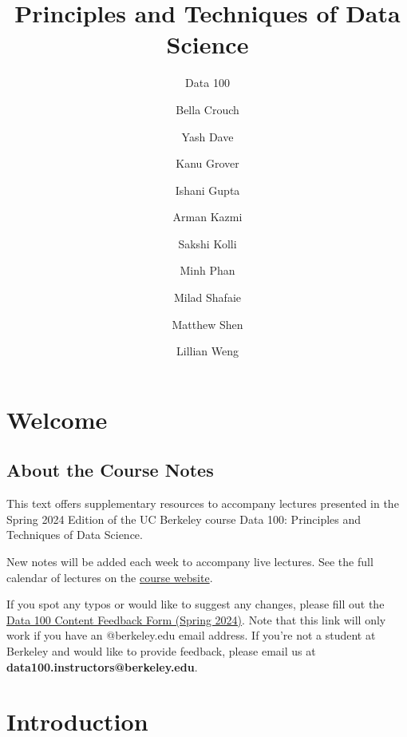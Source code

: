 \documentclass[
  letterpaper,
  DIV=11,
  numbers=noendperiod]{scrreprt}
\title{Principles and Techniques of Data Science}
\subtitle{Data 100}
\author{Bella Crouch \and Yash Dave \and Kanu Grover \and Ishani
Gupta \and Arman Kazmi \and Sakshi Kolli \and Minh Phan \and Milad
Shafaie \and Matthew Shen \and Lillian Weng}
\date{}
\renewcommand*\contentsname{Table of contents}
\newcommand\contentsname{Table of contents}
\begin{document}
\maketitle
\ifdefined\Shaded\renewenvironment{Shaded}{\begin{tcolorbox}[boxrule=0pt, frame hidden, enhanced, sharp corners, breakable, borderline west={3pt}{0pt}{shadecolor}, interior hidden]}{\end{tcolorbox}}\fi

\renewcommand*\contentsname{Table of contents}
{
\hypersetup{linkcolor=}
\setcounter{tocdepth}{2}
\tableofcontents
}

\hypertarget{welcome}{%
\chapter*{Welcome}\label{welcome}}


\hypertarget{about-the-course-notes}{%
\section*{About the Course Notes}\label{about-the-course-notes}}


This text offers supplementary resources to accompany lectures presented
in the Spring 2024 Edition of the UC Berkeley course Data 100:
Principles and Techniques of Data Science.

New notes will be added each week to accompany live lectures. See the
full calendar of lectures on the \href{https://ds100.org/sp24/}{course
website}.

If you spot any typos or would like to suggest any changes, please fill
out the \href{https://forms.gle/UL4xMNZVmjTbBLea9}{Data 100 Content
Feedback Form (Spring 2024)}. Note that this link will only work if you
have an @berkeley.edu email address. If you're not a student at Berkeley
and would like to provide feedback, please email us at
\textbf{data100.instructors@berkeley.edu}.


\hypertarget{introduction}{%
\chapter{Introduction}\label{introduction}}
\end{document}
